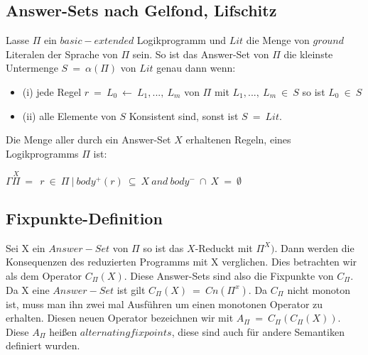 \subsection{Answer-Sets nach Gelfond, Lifschitz}

Lasse $\Pi$ ein $basic-extended$ Logikprogramm und $Lit$ die Menge von
$ground$ Literalen der Sprache von $\Pi$ sein\cite{GelfondLifschitz1991}. So ist das Answer-Set
von $\Pi$ die kleinste Untermenge $S~=~\alpha(\Pi)$ von $Lit$ genau dann wenn:

\begin{itemize}
	\item (i) jede Regel $r~=~L_0~\leftarrow~L_1 ,...,~L_m$ von $\Pi$ mit $L_1 ,...,~L_m~\in~S$ so ist $L_0~\in~S$
	\item (ii) alle Elemente von $S$ Konsistent sind, sonst ist $S~=~Lit$.
\end{itemize}

Die Menge aller durch ein Answer-Set $X$ erhaltenen Regeln,
eines Logikprogramms $\Pi$ ist:

\begin{center}
  $\Gamma\stackrel{X}{\Pi}~=~{~r~\in~\Pi~|~body^+(r)~\subseteq~X~and~body^-~\cap~X~=~\emptyset~}~$\\
\end{center}


\subsection{Fixpunkte-Definition}

Sei X ein $Answer-Set$ von $\Pi$ so ist das $X$-Reduckt mit $\Pi^X)$. 
Dann werden die Konsequenzen des reduzierten Programms mit X verglichen. 
Dies betrachten wir als dem Operator $C_\Pi(X)$. Diese Answer-Sets sind also die Fixpunkte von $C_\Pi$. 
Da X eine $Answer-Set$ ist gilt $C_\Pi(X)~=~Cn(\Pi^x)$. 
Da $C_\Pi$ nicht monoton ist, muss man ihn zwei mal Ausführen um einen monotonen Operator zu erhalten. Diesen neuen Operator bezeichnen wir mit $A_\Pi~=~C_\Pi(C_\Pi(X))$. 
Diese $A_\Pi$ heißen $alternating fixpoints$, diese sind auch für andere Semantiken definiert wurden.
